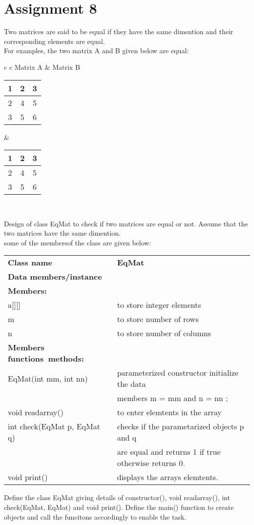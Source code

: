 
\section*{\centering Assignment 8}
\vspace{15px}
Two matrices are said to be equal if they have the same dimention and their
corresponding elements are equal.\\
For examples, the two matrix A and B given below are equal:

\begin{tabular}{ c c }
	Matrix A & Matrix B \\
	\begin{tabular}{|c|c|c|}
\hline
		1 & 2 & 3 \\ \hline
		2 & 4 & 5 \\ \hline
		3 & 5 & 6 \\ \hline
	\end{tabular} & 
	\begin{tabular}{|c|c|c|}
\hline
		1 & 2 & 3 \\ \hline
		2 & 4 & 5 \\ \hline
		3 & 5 & 6 \\ \hline
	\end{tabular}\\
\end{tabular}

Design of class EqMat to check if two matrices are equal or not. Assume that the two matrices
have the same dimention.\\
some of the membersof the class are given below:\\
\begin{tabular}{ll}
	\textbf{Class name} & \textbf{EqMat} \\
	\textbf{Data  members/instance}\\
	\textbf{Members:}\\
	a[][] & to store integer elements\\
	m & to store number of rows \\
	n & to store number of columns\\
	\textbf{Members functions\ methods:}\\
	EqMat(int mm, int nn) & parameterized constructor initialize the data\\
	& members m = mm and n = nn ;\\
	void readarray() & to enter elemtents in the array \\
	int check(EqMat p, EqMat q) & checks if the parametarized objects p and q\\
	& are equal and returns 1 if true otherwise returns 0. \\
	void print() & displays the arrays elemtents. \\
\end{tabular}
Define the class EqMat giving details of constructor(), void readarray(), int check(EqMat, EqMat) and void
print(). Define the main() function to create objects and call the funcitons accordingly to enable the task.

